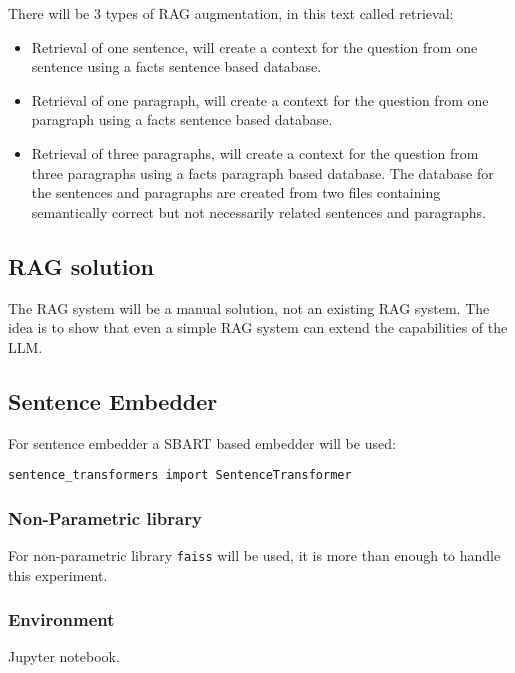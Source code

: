 \documentclass{wseas}
\begin{document}
There will be 3 types of RAG augmentation, in this text called
retrieval:

\begin{itemize}
\item
  Retrieval of one sentence, will create a context for the question from
  one sentence using a facts sentence based database.
\item
  Retrieval of one paragraph, will create a context for the question
  from one paragraph using a facts sentence based database.
\item
  Retrieval of three paragraphs, will create a context for the question
  from three paragraphs using a facts paragraph based database. The
  database for the sentences and paragraphs are created from two files
  containing semantically correct but not necessarily related sentences
  and paragraphs.
\end{itemize}

\subsection{RAG solution}

The RAG system will be a manual solution, not an existing RAG system.
The idea is to show that even a simple RAG system can extend the
capabilities of the LLM.

\subsection{Sentence Embedder}

For sentence embedder a SBART based embedder will be used:

\begin{verbatim}
sentence_transformers import SentenceTransformer
\end{verbatim}

\subsubsection{Non-Parametric library}

For non-parametric library \texttt{faiss} will be used, it is more than
enough to handle this experiment.

\subsubsection{Environment}

Jupyter notebook.
\end{document}
